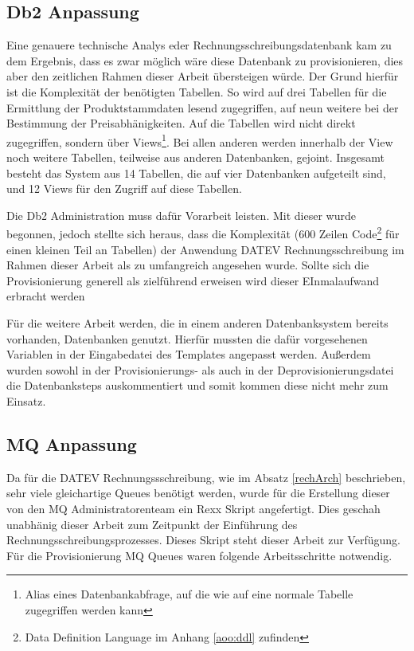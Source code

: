\subsection{Db2 Anpassung}\label{ssec:db2entw}
Eine genauere technische Analys eder Rechnungsschreibungsdatenbank kam zu dem  Ergebnis, dass es zwar möglich wäre diese Datenbank zu provisionieren, dies aber den zeitlichen Rahmen dieser Arbeit übersteigen würde.
Der Grund hierfür ist die Komplexität der benötigten Tabellen.
So wird auf drei Tabellen für die Ermittlung der Produktstammdaten lesend zugegriffen, auf neun weitere bei der Bestimmung der Preisabhänigkeiten.
Auf die Tabellen wird nicht direkt zugegriffen, sondern über Views\footnote{Alias eines Datenbankabfrage, auf die wie auf eine normale Tabelle zugegriffen werden kann}.
Bei allen anderen werden innerhalb der View noch weitere Tabellen, teilweise aus anderen Datenbanken, gejoint.
Insgesamt besteht das System aus 14 Tabellen, die auf vier Datenbanken aufgeteilt sind, und 12 Views für den Zugriff auf diese Tabellen.

Die Db2 Administration muss dafür Vorarbeit leisten.
Mit dieser wurde begonnen, jedoch stellte sich heraus, dass die Komplexität (600 Zeilen Code\footnote{Data Definition Language im Anhang \ref{aoo:ddl} zufinden} für einen kleinen Teil an Tabellen) der Anwendung DATEV Rechnungsschreibung im Rahmen dieser Arbeit als zu umfangreich angesehen wurde.
Sollte sich die Provisionierung generell als zielführend erweisen wird dieser EInmalaufwand erbracht werden

Für die weitere Arbeit werden, die in einem anderen Datenbanksystem bereits vorhanden, Datenbanken genutzt.
Hierfür mussten die dafür vorgesehenen Variablen in der Eingabedatei des Templates angepasst werden.
Außerdem wurden sowohl in der Provisionierungs- als auch in der Deprovisionierungsdatei die Datenbanksteps auskommentiert und somit kommen diese nicht mehr zum Einsatz.

\subsection{MQ Anpassung}\label{ssec:mqentw}
Da für die DATEV Rechnungssschreibung, wie im Absatz \ref{rechArch} beschrieben, sehr viele gleichartige Queues benötigt werden, wurde für die Erstellung dieser von den MQ Administratorenteam ein Rexx Skript angefertigt.
Dies geschah unabhänig dieser Arbeit zum Zeitpunkt der Einführung des Rechnungsschreibungsprozesses.
Dieses Skript steht dieser Arbeit zur Verfügung.
Für die Provisionierung MQ Queues waren folgende Arbeitsschritte notwendig.

